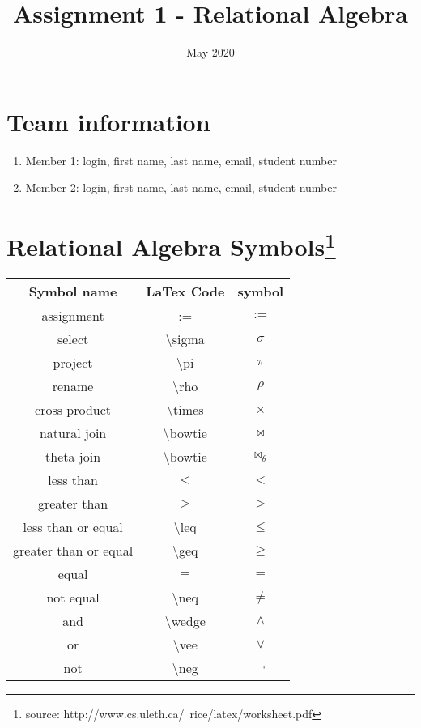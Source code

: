 \documentclass{article}
\title{Assignment 1 - Relational Algebra}
\date{May 2020}
\begin{document}
\maketitle

\section*{Team information}
\begin{enumerate}
\item Member 1: {login, first name, last name, email, student number}
\item Member 2: {login, first name, last name, email, student number}
\end{enumerate}


\section*{Relational Algebra Symbols\footnote{source: http://www.cs.uleth.ca/~rice/latex/worksheet.pdf}}

\begin{center}
 \begin{tabular}{|c | c | c|} 
 \hline
 Symbol name & LaTex Code & symbol \\ [1ex] 
 \hline\hline
assignment & := & $:=$  \\ 
select & \textbackslash sigma & $\sigma$ \\ 
project & \textbackslash pi & $\pi$ \\ 
rename & \textbackslash rho & $\rho$ \\ 
cross product & \textbackslash times & $\times$ \\ 
natural join & \textbackslash bowtie & $\bowtie$ \\ 
theta join & \textbackslash bowtie & $\bowtie_{\theta}$ \\ 
less than & $<$ & $<$ \\ 
greater than & $>$ & $>$ \\ 
less than or equal & \textbackslash leq & $\leq$ \\ 
greater than or equal & \textbackslash geq & $\geq$ \\ 
equal & $=$ & $=$ \\ 
not equal & \textbackslash neq & $\neq$ \\ 
and & \textbackslash wedge & $\wedge$ \\ 
or & \textbackslash vee & $\vee$ \\ 
not & \textbackslash neg & $\neg$  \\ [1ex]  
  \hline
\end{tabular}
\end{center}
\end{document}
